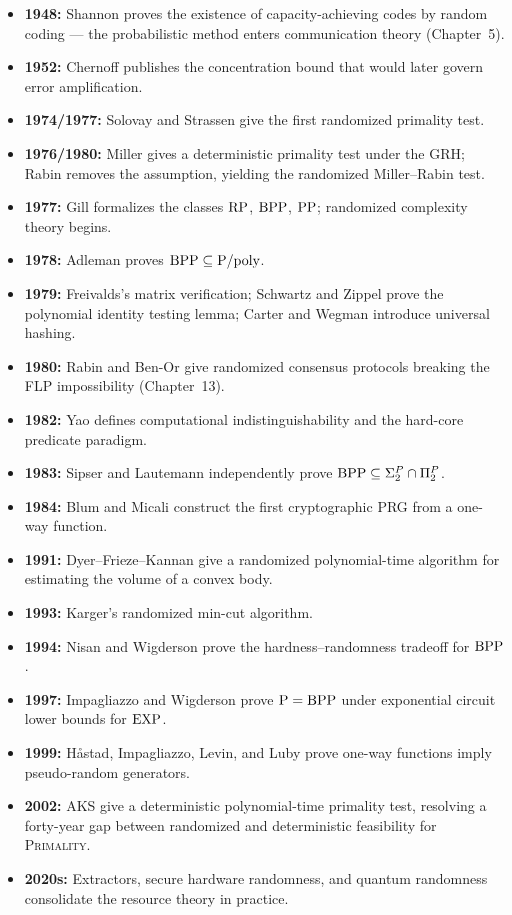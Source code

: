 \begin{itemize}
\item \textbf{1948:} Shannon proves the existence of capacity-achieving codes by random coding --- the probabilistic method enters communication theory (Chapter~5).
\item \textbf{1952:} Chernoff publishes the concentration bound that would later govern error amplification.
\item \textbf{1974/1977:} Solovay and Strassen give the first randomized primality test.
\item \textbf{1976/1980:} Miller gives a deterministic primality test under the GRH; Rabin removes the assumption, yielding the randomized Miller--Rabin test.
\item \textbf{1977:} Gill formalizes the classes $\text{RP}$, $\text{BPP}$, $\text{PP}$; randomized complexity theory begins.
\item \textbf{1978:} Adleman proves $\text{BPP} \subseteq \text{P}/\text{poly}$.
\item \textbf{1979:} Freivalds's matrix verification; Schwartz and Zippel prove the polynomial identity testing lemma; Carter and Wegman introduce universal hashing.
\item \textbf{1980:} Rabin and Ben-Or give randomized consensus protocols breaking the FLP impossibility (Chapter~13).
\item \textbf{1982:} Yao defines computational indistinguishability and the hard-core predicate paradigm.
\item \textbf{1983:} Sipser and Lautemann independently prove $\text{BPP} \subseteq \Sigma_2^P \cap \Pi_2^P$.
\item \textbf{1984:} Blum and Micali construct the first cryptographic PRG from a one-way function.
\item \textbf{1991:} Dyer--Frieze--Kannan give a randomized polynomial-time algorithm for estimating the volume of a convex body.
\item \textbf{1993:} Karger's randomized min-cut algorithm.
\item \textbf{1994:} Nisan and Wigderson prove the hardness--randomness tradeoff for $\text{BPP}$.
\item \textbf{1997:} Impagliazzo and Wigderson prove $\text{P} = \text{BPP}$ under exponential circuit lower bounds for $\text{EXP}$.
\item \textbf{1999:} H{\aa}stad, Impagliazzo, Levin, and Luby prove one-way functions imply pseudo-random generators.
\item \textbf{2002:} AKS give a deterministic polynomial-time primality test, resolving a forty-year gap between randomized and deterministic feasibility for \textsc{Primality}.
\item \textbf{2020s:} Extractors, secure hardware randomness, and quantum randomness consolidate the resource theory in practice.
\end{itemize}

